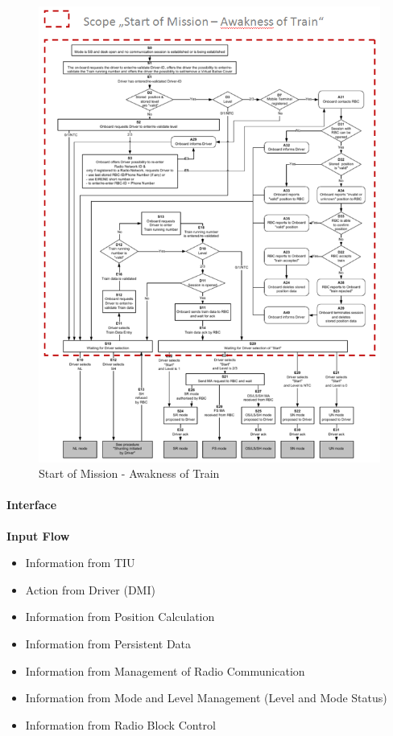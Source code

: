 \begin{figure}[h]
\centering
\includegraphics[scale=0.8]{images/SoMAwaknessoftrain}
\caption{Start of Mission - Awakness of Train}
\label{Start of Mission - Awakness of Train}
\end{figure}
\clearpage

\paragraph{Interface}
\textbf{Input Flow}
\begin{itemize}
\item Information from TIU
\item Action from Driver (DMI)
\item Information from Position Calculation
\item Information from Persistent Data
\item Information from Management of Radio Communication
\item Information from Mode and Level Management (Level and Mode Status)
\item Information from Radio Block Control
\end{itemize}

